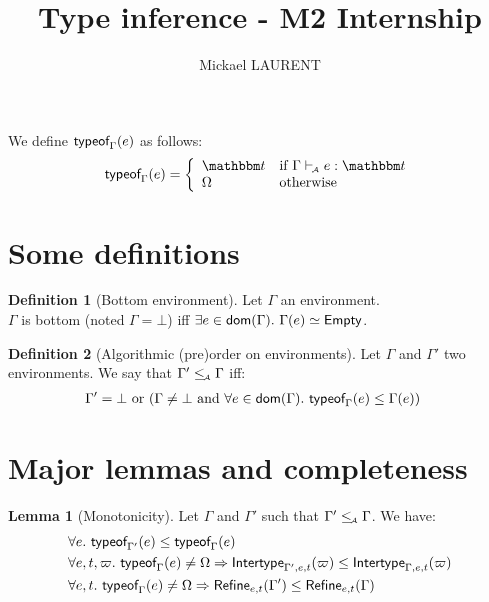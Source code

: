 \documentclass[a4paper]{article}
\title{\vspace{1.5cm}Type inference - M2 Internship}
\author{Mickael LAURENT}
\date{\vspace{-5ex}}
\theoremstyle{definition}
\newtheorem{lemma}{Lemma}
\newtheorem{definition}{Definition}
\begin{document}
  \maketitle

  We define $\textsf{typeof}_{\Gamma}(e)$ as follows:
  \begin{align*}
    \tyof e \Gamma = 
    \left\{\begin{array}{ll}
      \ts & \text{if } \Gamma \vdashA e:\ts \\
      \tsempty & \text{otherwise}
    \end{array}\right.
  \end{align*}

  \section{Some definitions}

    \begin{definition}[Bottom environment]
      Let $\Gamma$ an environment.\\
      $\Gamma$ is bottom (noted $\Gamma = \bot$) iff $\exists e\in\dom\Gamma.\ \Gamma(e)\simeq\Empty$.
    \end{definition}

    \begin{definition}[Algorithmic (pre)order on environments]
    Let $\Gamma$ and $\Gamma'$ two environments. We say that $\Gamma' \leq_{\!\scriptscriptstyle\mathcal{A}} \Gamma$ iff:
    \begin{align*}
        &\Gamma'=\bot \text{ or } (\Gamma\neq\bot \text{ and } \forall e \in \textsf{dom}(\Gamma).\ \textsf{typeof}_{\Gamma}(e) \leq \Gamma(e))
    \end{align*}
    \end{definition}

  \section{Major lemmas and completeness}

  \begin{lemma}[Monotonicity] Let $\Gamma$ and $\Gamma'$ such that $\Gamma'\leq_{\!\scriptscriptstyle\mathcal{A}}\Gamma $. We have:
    \begin{align*}
      &\forall e.\ \textsf{typeof}_{\Gamma'}(e) \leq \textsf{typeof}_{\Gamma}(e)\\
      &\forall e,t,\varpi.\ \textsf{typeof}_{\Gamma}(e) \neq \Omega \Rightarrow \textsf{Intertype}_{\Gamma',e,t} (\varpi) \leq \textsf{Intertype}_{\Gamma,e,t} (\varpi)\\
      &\forall e,t.\ \textsf{typeof}_{\Gamma}(e) \neq \Omega \Rightarrow \textsf{Refine}_{e,t}(\Gamma') \leq \textsf{Refine}_{e,t}(\Gamma)\\
    \end{align*}
  \end{lemma}
\end{document}
